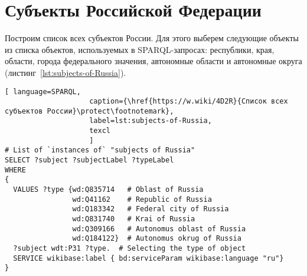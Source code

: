 \section{Субъекты Российской Федерации}

Построим список всех субъектов России. Для этого выберем следующие объекты из списка объектов, используемых в SPARQL-запросах: республики, края, области, города федерального значения, автономные области и автономные округа (листинг~\protect\ref{lst:subjects-of-Russia}).


\begin{lstlisting}[ language=SPARQL, 
                    caption={\href{https://w.wiki/4D2R}{Список всех субъектов России}\protect\footnotemark},
                    label=lst:subjects-of-Russia,
                    texcl 
                    ]
# List of `instances of` "subjects of Russia" 
SELECT ?subject ?subjectLabel ?typeLabel
WHERE
{  
  VALUES ?type {wd:Q835714   # Oblast of Russia
                wd:Q41162    # Republic of Russia
                wd:Q183342   # Federal city of Russia
                wd:Q831740   # Krai of Russia
                wd:Q309166   # Autonomus oblast of Russia
                wd:Q184122}  # Autonomus okrug of Russia
  ?subject wdt:P31 ?type.  # Selecting the type of object
  SERVICE wikibase:label { bd:serviceParam wikibase:language "ru"}
}
\end{lstlisting}%

